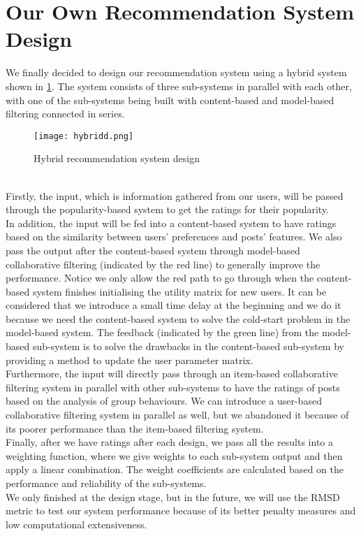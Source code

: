 \section{Our Own Recommendation System Design}
We finally decided to design our recommendation system using a hybrid system shown in \cref{hybridd}. The system consists of three sub-systems in parallel with each other, with one of the sub-systems being built with content-based and model-based filtering connected in series.
\begin{figure}[ht]
    \centering
    \texttt{[image: hybridd.png]}
    \caption{Hybrid recommendation system design}
    \label{hybridd}
    \end{figure}
\\Firstly, the input, which is information gathered from our users, will be passed through the popularity-based system to get the ratings for their popularity.
\\In addition, the input will be fed into a content-based system to have ratings based on the similarity between users' preferences and posts' features. 
We also pass the output after the content-based system through model-based collaborative filtering (indicated by the red line) to generally improve the performance. Notice we only allow the red path to go through when the content-based system finishes initialising the utility matrix for new users. It can be considered that we introduce a small time delay at the beginning and we do it because we need the content-based system to solve the cold-start problem in the model-based system. The feedback (indicated by the green line) from the model-based sub-system is to solve the drawbacks in the content-based sub-system by providing a method to update the user parameter matrix.
\\Furthermore, the input will directly pass through an item-based collaborative filtering system in parallel with other sub-systems 
to have the ratings of posts based on the analysis of group behaviours. We can introduce a user-based collaborative filtering system in parallel as well, but we abandoned it because of its poorer performance than the item-based filtering system.
\\Finally, after we have ratings after each design, we pass all the results into a weighting function, where we give weights to each sub-system output and then apply a linear combination.
The weight coefficients are calculated based on the performance and reliability of the sub-systems.
\\We only finished at the design stage, but in the future, we will use the RMSD metric to test our system performance because of its better penalty measures and low computational extensiveness. 

